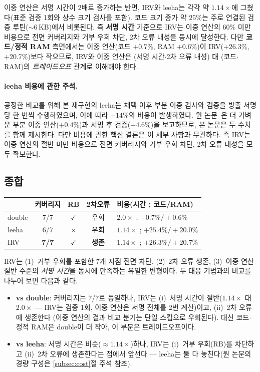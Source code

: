 이중 연산은 서명 시간이 2배로 증가하는 반면, \textsf{IRV}와 \textsf{leeha}는 각각 약 $1.14\times$에
그쳤다(표준 검증 1회와 상수 크기 검사를 포함). 코드 크기 증가 약 $25\%$는 주로 연결된 검증
루틴($\sim$6\,KB)에서 비롯된다. 즉 \textbf{서명 시간} 기준으로 IRV는 이중 연산의 $60\%$ 미만 비용으로
전면 커버리지와 거부 우회 차단, 2차 오류 내성을 동시에 달성한다. 다만 \textbf{코드/정적 RAM} 측면에서는
이중 연산(코드 $+0.7\%$, RAM $+0.6\%$)이 IRV($+26.3\%$, $+20.7\%$)보다 작으므로, IRV와 이중 연산은
(서명 시간$\cdot$2차 오류 내성) 대 (코드$\cdot$RAM)의 \emph{트레이드오프} 관계로 이해해야 한다.

\paragraph{\textsf{leeha} 비용에 관한 주석.}
공정한 비교를 위해 본 재구현의 \textsf{leeha}는 채택 이후 부분 이중 검사와 검증을 방출 서명당 한
번씩 수행하였으며, 이에 따라 $+14\%$의 비용이 발생하였다. 원 논문~\cite{lee2026haetae}은 더 가벼운
부분 이중 연산($+0.4\%$)과 서명 후 검증($+4.6\%$)을 보고하므로, 본 논문은 두 수치를 함께 제시한다.
다만 비용에 관한 핵심 결론은 이 세부 사항과 무관하다. 즉 IRV는 이중 연산의 절반 미만 비용으로
전면 커버리지와 거부 우회 차단, 2차 오류 내성을 모두 확보한다.

\subsection{종합}
\label{subsec:summary}
\begin{table}[H]\centering
\small
\begin{tabular}{@{}lcccl@{}}
\toprule
 & 커버리지 & RB & 2차오류 & 비용(시간 ; 코드/RAM) \\
\midrule
\textsf{double} & 7/7 & $\checkmark$ & 우회 & $2.0\times$ ; $+0.7\%/+0.6\%$ \\
\textsf{leeha}  & 6/7 & $\times$ & 우회 & $1.14\times$ ; $+25.4\%/+20.0\%$ \\
\textsf{IRV}    & \textbf{7/7} & \textbf{$\checkmark$} & \textbf{생존} & $1.14\times$ ; $+26.3\%/+20.7\%$ \\
\bottomrule
\end{tabular}
\end{table}

IRV는 (1)~거부 우회를 포함한 7개 지점 전면 차단, (2)~2차 오류 생존, (3)~이중 연산 절반 수준의
\emph{서명 시간}을 동시에 만족하는 유일한 변형이다. 두 대응 기법과의 비교를 나누어 보면 다음과 같다.
\begin{itemize}
  \item \textbf{vs \textsf{double}}: 커버리지는 7/7로 동일하나, IRV는 (i)~서명 시간이 절반($1.14\times$ 대
        $2.0\times$ --- IRV는 검증 1회, 이중 연산은 서명 전체를 2번 계산)이고, (ii)~2차 오류에 생존한다
        (이중 연산의 결과 비교 분기는 단일 스킵으로 우회된다). 대신 코드$\cdot$정적 RAM은 \textsf{double}이
        더 작아, 이 부분은 트레이드오프이다.
  \item \textbf{vs \textsf{leeha}}: 서명 시간은 비슷($\approx1.14\times$)하나, IRV는 (i)~거부 우회(RB)를
        차단하고 (ii)~2차 오류에 생존한다는 점에서 앞선다 --- \textsf{leeha}는 둘 다 놓친다(원 논문의
        경량 구성은 \ref{subsec:cost}절 주석 참조).
\end{itemize}

